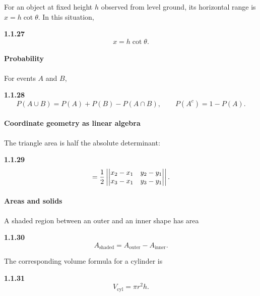 \setcounter{enumii}{27}\setcounter{equation}{0}
For an object at fixed height $h$ observed from level ground, its horizontal range is $x=h\cot\theta$.
In this situation,
\par\noindent\textbf{1.1.27}\quad
\begin{equation}
x=h\cot\theta.\tag{1.1.27.1}\label{eq:horizontal-range}
\end{equation}

\paragraph*{Probability}
\setcounter{enumii}{28}\setcounter{equation}{0}
For events $A$ and $B$,

\par\noindent\textbf{1.1.28}\quad
\begin{equation}
P(A\cup B)=P(A)+P(B)-P(A\cap B),\qquad P(A^c)=1-P(A).
\label{eq:prob-union}
\end{equation}

\paragraph*{Coordinate geometry as linear algebra}
\setcounter{enumii}{29}\setcounter{equation}{0}
The triangle area is half the absolute determinant:

\par\noindent\textbf{1.1.29}\quad
\begin{equation}
[ABC]=\frac12\left|\mydet{x_2-x_1&y_2-y_1\\x_3-x_1&y_3-y_1}\right|.
\label{eq:triangle-det}
\end{equation}

\paragraph*{Areas and solids}
\setcounter{enumii}{30}\setcounter{equation}{0}
A shaded region between an outer and an inner shape has area
\par\noindent\textbf{1.1.30}\quad
\begin{equation}
A_{\mathrm{shaded}}=A_{\mathrm{outer}}-A_{\mathrm{inner}}.\tag{1.1.30.1}\label{eq:shaded-area}
\end{equation}

\setcounter{enumii}{31}\setcounter{equation}{0}
The corresponding volume formula for a cylinder is

\par\noindent\textbf{1.1.31}\quad
\begin{equation}
V_{\mathrm{cyl}}=\pi r^2h.
\label{eq:cylinder-formula}
\end{equation}

